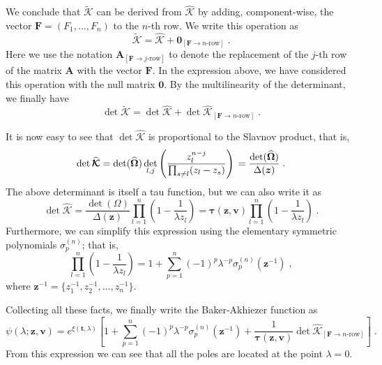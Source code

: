 \documentclass[a4paper,12pt]{amsart}
\begin{document}
We conclude that \(\widetilde{\bm{\mathcal{K}}}\) can be derived from
\(\widehat{\bm{\mathcal{K}}}\) by adding, component-wise, the vector
\(\bm{F} = (F_1, \dots , F_n)\) to the \(n\)-th row.  We write this
operation as
\begin{equation}
  \widetilde{\bm{\mathcal{K}}} = \widehat{\bm{\mathcal{K}}} + \bm{0}_{[ \bm{F} \to n\text{-row}]}\; . 
\end{equation}
Here we use the notation \(\mathcal{\bm{A}}_{[ \bm{F} \to j\text{-row}]}\) 
to denote the replacement of the \(j\)-th row of the matrix 
\(\mathcal{\bm{A}}\) with the vector \(\bm{F}\). In the expression above, 
we have considered this operation with the null matrix \(\bm{0}\).
By the multilinearity of the determinant, we finally have
\begin{equation}
  \det \widetilde{\bm{\mathcal{K}}} = 
    \det \widehat{\bm{\mathcal{K}}} + 
    \det \widehat{\bm{\mathcal{K}}}_{[\bm{F} \to n\text{-row}]}\; .
\end{equation}

It is now easy to see that \(\det \widehat{\bm{\mathcal{K}}}\) is
proportional to the Slavnov product, that is,
\begin{equation}
    \det \widehat{\bm{\mathcal{K}}}  = 
    \det(\widehat{\bm{\Omega}})
    \det_{l,j}
    \left( \frac{z_l^{n-j}}{\prod_{s\neq l} (z_l - z_s)} \right)\\
    = \frac{\det(\widehat{\bm{\Omega}})}{\Delta(\bm{z})}\;. 
\end{equation}
The above determinant is itself a tau function, but we can also write
it as
\begin{equation}
    \det \widehat{\mathcal{K}} = 
    \frac{\det(\Omega)}{\Delta(\bm{z})}
    \prod_{l=1}^n \left( 1 - \frac{1}{\lambda z_l} \right) 
    = \bm{\tau}(\bm{z}, \bm{v}) \prod_{l=1}^n \left( 1 - \frac{1}{\lambda z_l} \right) \; . 
\end{equation}
Furthermore, we can simplify this expression using the elementary
symmetric polynomials \(\sigma_p^{(n)}\); that is,
\begin{equation}
  \prod_{l=1}^n \left( 1 - \frac{1}{\lambda z_l} \right) = 1 + 
  \sum_{p=1}^n (-1)^p \lambda^{-p} \sigma_p^{(n)}(\bm{z}^{-1})\; , 
\end{equation}
where \( \bm{z}^{-1} = \{z_1^{-1}, z_2^{-1}, \dots , z_n^{-1}\}\). 

Collecting all these facts, we finally write the Baker-Akhiezer
function as
\begin{equation}
  \psi(\lambda; \bm{z}, \bm{v}) =
  e^{\xi(\bm{t}, \lambda)}  \left[ 1 + 
  \sum_{p=1}^n (-1)^p \lambda^{-p} \sigma_p^{(n)}(\bm{z}^{-1})
    + \frac{1}{\bm{\tau}(\bm{z}, \bm{v})}
    \det \widehat{\bm{\mathcal{K}}}_{[\bm{F} \to n\text{-row}]}
  \right]\; .
\end{equation}
From this expression we can see that all the poles are located at the
point \(\lambda = 0\).
\end{document}
